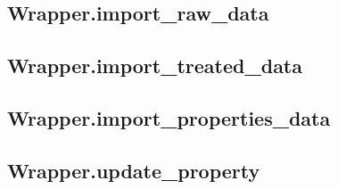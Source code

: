 \subsection{Wrapper.import\_raw\_data}\label{subsec:wrapper.import_raw_data}


\subsection{Wrapper.import\_treated\_data}\label{subsec:wrapper.import_treated_data}


\subsection{Wrapper.import\_properties\_data}\label{subsec:wrapper.import_properties_data}


\subsection{Wrapper.update\_property}\label{subsec:wrapper.update_property}

